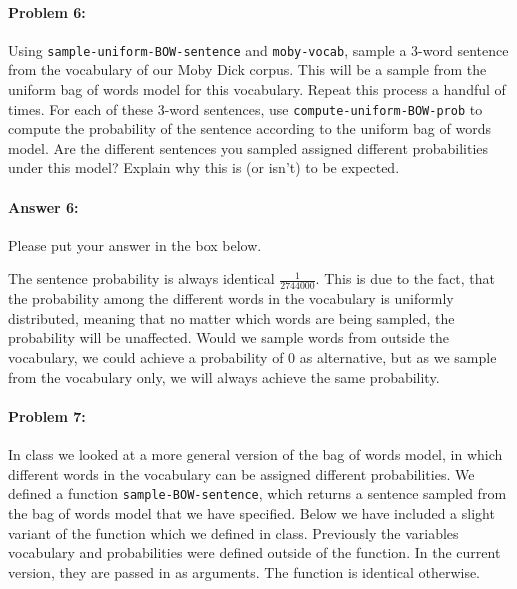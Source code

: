 \documentclass[10pt]{article}
\newenvironment{AnswerBox}{\begin{mdframed}[style=simple]}{\end{mdframed}}
\begin{document}
\paragraph{Problem 6:}

Using \texttt{sample-uniform-BOW-sentence} and \texttt{moby-vocab}, sample a
3-word sentence from the vocabulary of our Moby Dick corpus. This will be a
sample from the uniform bag of words model for this vocabulary. Repeat this
process a handful of times. For each of these 3-word sentences, use
\texttt{compute-uniform-BOW-prob} to compute the probability of the sentence
according to the uniform bag of words model. Are the different sentences you
sampled assigned different probabilities under this model? Explain why this is
(or isn't) to be expected.

\paragraph{Answer 6:} Please put your answer in the box below.

\begin{AnswerBox}%

    The sentence probability is always identical $\frac{1}{2744000}$. This is due to the fact, that the probability among the different words in the vocabulary is uniformly distributed, meaning that no matter which words are being sampled, the probability will be unaffected. Would we sample words from outside the vocabulary, we could achieve a probability of 0 as alternative, but as we sample from the vocabulary only, we will always achieve the same probability.

\end{AnswerBox}%

\hrulefill %

\paragraph{Problem 7:}

In class we looked at a more general version of the bag of words
model, in which different words in the vocabulary can be assigned
different probabilities. We defined a function \texttt{sample-BOW-sentence},
which returns a sentence sampled from the bag of words model that we
have specified. Below we have included a slight variant of the
function which we defined in class. Previously the variables
vocabulary and probabilities were defined outside of the function. In
the current version, they are passed in as arguments. The function is
identical otherwise.
\end{document}
